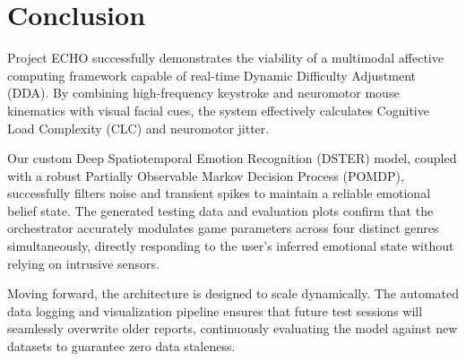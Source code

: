 \documentclass[11pt,a4paper]{article}
\begin{document}
\section{Conclusion}

Project ECHO successfully demonstrates the viability of a multimodal affective computing framework capable of real-time Dynamic Difficulty Adjustment (DDA). By combining high-frequency keystroke and neuromotor mouse kinematics with visual facial cues, the system effectively calculates Cognitive Load Complexity (CLC) and neuromotor jitter. 

Our custom Deep Spatiotemporal Emotion Recognition (DSTER) model, coupled with a robust Partially Observable Markov Decision Process (POMDP), successfully filters noise and transient spikes to maintain a reliable emotional belief state. The generated testing data and evaluation plots confirm that the orchestrator accurately modulates game parameters across four distinct genres simultaneously, directly responding to the user's inferred emotional state without relying on intrusive sensors. 

Moving forward, the architecture is designed to scale dynamically. The automated data logging and visualization pipeline ensures that future test sessions will seamlessly overwrite older reports, continuously evaluating the model against new datasets to guarantee zero data staleness.
\end{document}

